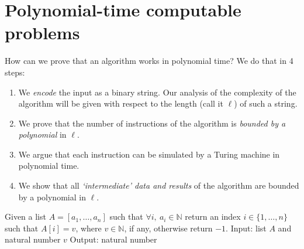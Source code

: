 \section{Polynomial-time computable problems}

How can we prove that an algorithm works in polynomial time?
We do that in 4 steps:

\begin{enumerate}
	\item We \emph{encode} the input as a binary string. Our analysis of the complexity of the algorithm will be given with respect to the length (call it $\ell$) of such a string.

	\item We prove that the number of instructions of the algorithm is \emph{bounded by a polynomial} in $\ell$.

	\item We argue that each instruction can be simulated by a Turing machine in polynomial time.

	\item We show that all \emph{`intermediate' data and results} of the algorithm are bounded by a polynomial in $\ell$.
\end{enumerate}


\begin{ex}
	Given a list $A = [a_1,\ldots,a_n]$ such that $\forall i,\ a_i \in \mathbb{N}$ return an index $i \in \{1,\ldots,n\}$ such that $A[i] = v$, where $v \in \mathbb{N}$, if any, otherwise return $-1$.
	Input: list $A$ and natural number $v$
	Output: natural number
	\label{ex:linear-search}
\end{ex}

